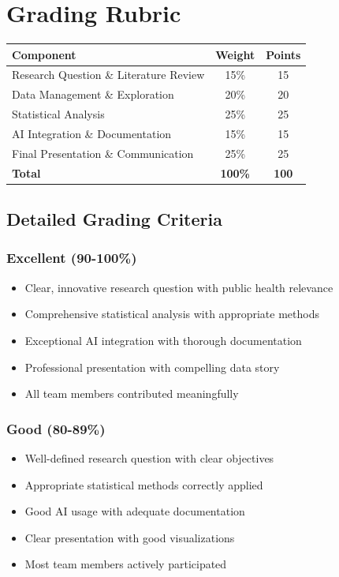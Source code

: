 \documentclass[11pt]{article}
\begin{document}
\section{Grading Rubric}

\begin{center}
\begin{tabular}{lcc}
\toprule
\textbf{Component} & \textbf{Weight} & \textbf{Points} \\
\midrule
Research Question \& Literature Review & 15\% & 15 \\
Data Management \& Exploration & 20\% & 20 \\
Statistical Analysis & 25\% & 25 \\
AI Integration \& Documentation & 15\% & 15 \\
Final Presentation \& Communication & 25\% & 25 \\
\midrule
\textbf{Total} & \textbf{100\%} & \textbf{100} \\
\bottomrule
\end{tabular}
\end{center}

\subsection{Detailed Grading Criteria}

\subsubsection{Excellent (90-100\%)}
\begin{itemize}
\item Clear, innovative research question with public health relevance
\item Comprehensive statistical analysis with appropriate methods
\item Exceptional AI integration with thorough documentation
\item Professional presentation with compelling data story
\item All team members contributed meaningfully
\end{itemize}

\subsubsection{Good (80-89\%)}
\begin{itemize}
\item Well-defined research question with clear objectives
\item Appropriate statistical methods correctly applied
\item Good AI usage with adequate documentation
\item Clear presentation with good visualizations
\item Most team members actively participated
\end{itemize}
\end{document}
